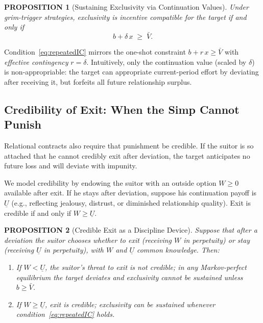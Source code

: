 \documentclass[AER]{AEA}
\newtheorem{proposition}{PROPOSITION}
\begin{document}
\begin{proposition}[Sustaining Exclusivity via Continuation Values]\label{prop:repeated}
Under grim-trigger strategies, exclusivity is incentive compatible for the target if and only if
\begin{equation}\label{eq:repeatedIC}
b + \delta\, x \;\ge\; \bar{V}.
\end{equation}
\end{proposition}

Condition~\eqref{eq:repeatedIC} mirrors the one-shot constraint $b+r\,x\ge \bar{V}$ with \emph{effective contingency} $r=\delta$.
Intuitively, only the continuation value (scaled by $\delta$) is non-appropriable: the target can appropriate current-period effort by deviating after receiving it, but forfeits all future relationship surplus.

\subsection{Credibility of Exit: When the Simp Cannot Punish}

Relational contracts also require that punishment be credible.
If the suitor is so attached that he cannot credibly exit after deviation, the target anticipates no future loss and will deviate with impunity.

We model credibility by endowing the suitor with an outside option $W\ge 0$ available after exit.
If he stays after deviation, suppose his continuation payoff is $\underline{U}$ (e.g., reflecting jealousy, distrust, or diminished relationship quality).
Exit is credible if and only if $W \ge \underline{U}$.

\begin{proposition}[Credible Exit as a Discipline Device]\label{prop:credibility}
Suppose that after a deviation the suitor chooses whether to exit (receiving $W$ in perpetuity) or stay (receiving $\underline{U}$ in perpetuity), with $W$ and $\underline{U}$ common knowledge.
Then:
\begin{enumerate}[leftmargin=0.75in]
\item If $W < \underline{U}$, the suitor's threat to exit is not credible; in any Markov-perfect equilibrium the target deviates and exclusivity cannot be sustained unless $b\ge \bar{V}$.
\item If $W \ge \underline{U}$, exit is credible; exclusivity can be sustained whenever condition~\eqref{eq:repeatedIC} holds.
\end{enumerate}
\end{proposition}
\end{document}

